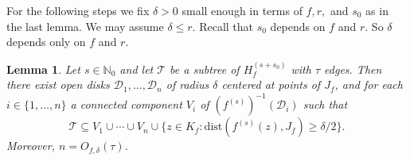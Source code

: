 \documentclass[12pt,oneside,a4]{amsart}
\newcommand{\IN}{\mathbb{N}}
\renewcommand{\cD}{\mathcal{D}}
\newcommand{\cT}{\mathcal{T}}
\newcounter{maincounter}
\numberwithin{maincounter}{section}
\numberwithin{equation}{section}
\newtheorem{lemma}[maincounter]{Lemma}
\renewcommand{\subset}{\subseteq}
\begin{document}
For the following steps we fix
$\delta>0$ small enough in terms of $f,r,$ and $s_0$ as in the last
lemma. We may assume $\delta\le r$.
Recall that $s_0$ depends on $f$ and $r$. So $\delta$
depends only on $f$ and $r$.
\begin{lemma}
  \label{lem:subtreecover}
  Let $s\in\IN_0$ and let $\cT$ be a subtree of $H_f^{(s+s_0)}$ with
  $\tau$ edges. Then there exist open disks $\cD_1,\ldots,\cD_n$ of radius
  $\delta$ centered at points of $J_f$, and for each $i\in \{1,\ldots,n\}$ a connected
  component $V_i$ of $(f^{(s)})^{-1}(\mathcal{D}_i)$ such that
  \begin{equation}
    \label{eq:subtreecoversubset}
    \cT\subset V_1\cup\cdots\cup V_n\cup \{ z\in K_f
    : \mathrm{dist}(f^{(s)}(z),J_f)\ge \delta/2\}.
  \end{equation}
  Moreover,  $n= O_{f,\delta}(\tau)$.
\end{lemma}
\end{document}
